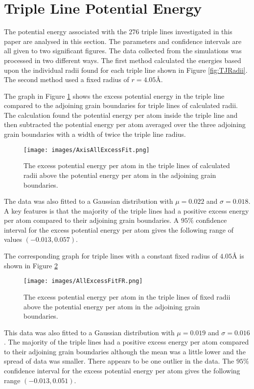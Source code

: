 \documentclass[12pt,a4paper,openany]{report}
\begin{document}
\newpage
\section{Triple Line Potential Energy}

The potential energy associated with the 276 triple lines investigated in this paper are analysed in this section. The parameters and confidence intervals are all given to two significant figures. The data collected from the simulations was processed in two different ways. The first method calculated the energies based upon the individual radii found for each triple line shown in Figure \ref{fig:TJRadii}. The second method used a fixed radius of $r = 4.05 \textrm{\AA}$. 

The graph in Figure \ref{fig:ExcessPEVR} shows the excess potential energy in the triple line compared to the adjoining grain boundaries for triple lines of calculated radii. The calculation found the potential energy per atom inside the triple line and then subtracted the potential energy per atom averaged over the three adjoining grain boundaries with a width of twice the triple line radius. 
 

\begin{figure}[H]
	\texttt{[image: images/AxisAllExcessFit.png]}
	\caption{The excess potential energy per atom in the triple lines of calculated radii above the potential energy per atom in the adjoining grain boundaries.} 
	\label{fig:ExcessPEVR}
\end{figure}

The data was also fitted to a Gaussian distribution with $\mu = 0.022$ and $\sigma = 0.018$. A key features is that the majority of the triple lines had a positive excess energy per atom compared to their adjoining grain boundaries. A $95\%$ confidence interval for the excess potential energy per atom
gives the following range of values $(-0.013, 0.057)$.

The corresponding graph for triple lines with a constant fixed radius of $4.05 \textrm{\AA}$ is shown in Figure \ref{fig:ExcessPEFR}

\begin{figure}[H]
	\texttt{[image: images/AllExcessFitFR.png]} 
	\caption{The excess potential energy per atom in the triple lines of fixed radii above the potential energy per atom in the adjoining grain boundaries.}
	\label{fig:ExcessPEFR}
\end{figure}

This data was also fitted to a Gaussian distribution with $\mu = 0.019$ and $\sigma = 0.016$. The majority of the triple lines had  a positive excess energy per atom compared to their adjoining grain boundaries although the mean was a little lower and the spread of data was smaller. There appears to be one outlier in the data. The $95\%$ confidence interval for the excess potential energy per atom gives the following range $(-0.013, 0.051)$.
\end{document}
